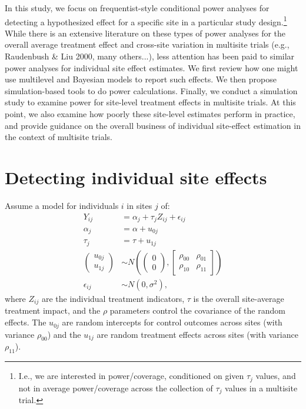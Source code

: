 \documentclass[]{article}
\begin{document}
In this study, we focus on frequentist-style conditional power analyses for detecting a hypothesized effect for a specific site in a particular study design.\footnote{I.e., we are interested in power/coverage, conditioned on given $\tau_j$ values, and not in average power/coverage across the collection of $\tau_j$ values in a multisite trial.}
While there is an extensive literature on these types of power analyses for the overall average treatment effect and cross-site variation in multisite trials (e.g., Raudenbush \& Liu 2000, many others...), less attention has been paid to similar power analyses for individual site effect estimates.
We first review how one might use multilevel and Bayesian models to report such effects.
We then propose simulation-based tools to do power calculations.
Finally, we conduct a simulation study to examine power for site-level treatment effects in multisite trials.
At this point, we also examine how poorly these site-level estimates perform in practice, and provide guidance on the overall business of individual site-effect estimation in the context of multisite trials.


\section{Detecting individual site effects}

Assume a model for individuals $i$ in sites $j$ of: 
\begin{align*}
	Y_{ij} &= \alpha_j + \tau_j Z_{ij} + \epsilon_{ij} \\
	\alpha_j &= \alpha + u_{0j} \\
	\tau_j &= \tau + u_{1j} \\
	\begin{pmatrix}
		u_{0j} \\ u_{1j}
	\end{pmatrix} &\sim N\left(
	\begin{pmatrix}
		0 \\ 0
	\end{pmatrix}, 
	\begin{bmatrix}
		\rho_{00} & \rho_{01} \\ \rho_{10} & \rho_{11}
	\end{bmatrix}\right) \\
	\epsilon_{ij} &\sim N(0, \sigma^2) ,
\end{align*}
where $Z_{ij}$ are the individual treatment indicators, $\tau$ is the overall site-average treatment impact, and the $\rho$ parameters control the covariance of the random effects.
The $u_{0j}$ are random intercepts for control outcomes across sites (with variance $\rho_{00}$) and the $u_{1j}$ are random treatment effects across sites (with variance $\rho_{11}$).
\end{document}
